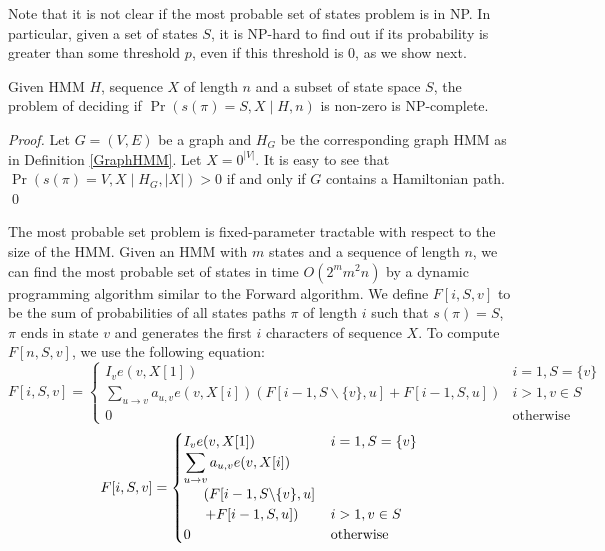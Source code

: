 
Note that it is not clear if the most probable set of states problem is in
NP. In particular, given a set of states $S$, it is NP-hard to find out if its
probability is greater than some threshold $p$, even if this threshold
is 0, as we show next.

\begin{theorem}
Given HMM $H$, sequence $X$ of length $n$ 
and a subset of state space $S$, the problem of deciding if
$\Pr\left(s(\pi)=S, X\mid H, n\right)$ is non-zero is NP-complete.
\end{theorem}

\begin{proof}
Let $G=(V,E)$ be a graph  
and $H_G$ be the corresponding graph HMM as
in Definition \ref{GraphHMM}. Let $X=0^{|V|}$.  
It is easy to see that $\Pr\left(s(\pi)=V,X \mid H_G, |X|
\right)>0$ if and only if $G$ contains a Hamiltonian path. \qed
\end{proof}

The most probable set problem is
fixed-parameter tractable with respect to the size of the HMM. Given
an HMM with $m$ states and a sequence of length $n$, we can find the
most probable set of states in time $O(2^m m^2 n)$ by a dynamic
programming algorithm similar to the Forward algorithm.
We define $F[i,S,v]$ to be the sum of probabilities of all
states paths $\pi$ of length $i$ such that $s(\pi)=S$, $\pi$ ends in
state $v$ and generates the first $i$ characters of sequence $X$.
To compute $F[n,S,v]$, we use the following equation:
\ifx\settwocolumn\undefined
$$F[i,S,v] = \begin{cases}
I_{v}e(v,X[1])& i=1,S=\{v\}\\ 
\displaystyle \sum_{u\to v}a_{u,v}e(v,X[i])\left(F[i-1,S\backslash\{v\},u]
+ F[i-1,S,u]\right) & i>1, v\in S\\
0 & \mbox{otherwise}
\end{cases}$$
\else
$$F[i,S,v] = \begin{cases}
I_{v}e(v,X[1])& i=1,S=\{v\}\\ 
\displaystyle \sum_{u\to v}a_{u,v}e(v,X[i])\\\hspace{5mm}\left(F[i-1,S\backslash\{v\},u]\right.
\\\hspace{5mm}\left.
+ F[i-1,S,u]\right) & i>1, v\in S\\
0 & \mbox{otherwise}
\end{cases}$$
\fi


